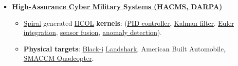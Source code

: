 \documentclass{article}
\newenvironment{achievements}{\begin{list}{$\bullet$}{\topsep 0pt \itemsep -2pt}}{\vspace*{4pt}\end{list}}
\begin{document}


        
\begin{itemize}

\item \textbf{\href{http://www.darpa.mil/Our_Work/I2O/Programs/High-Assurance_Cyber_Military_Systems_(HACMS).aspx}{High-Assurance Cyber Military Systems (HACMS, \href{http://www.darpa.mil/default.aspx}{DARPA})}}


  \begin{itemize}
    \item \href{http://spiral.net/}{Spiral}-generated \href{https://wiki.hh.se/wg211/images/e/e0/M13Franchetti.pdf}{HCOL} \textbf{kernels}: (\href{http://en.wikipedia.org/wiki/PID_controller}{PID controller}, \href{https://en.wikipedia.org/wiki/Kalman_filter}{Kalman filter}, \href{http://en.wikipedia.org/wiki/Euler_method}{Euler integration}, \href{https://en.wikipedia.org/wiki/Sensor_fusion}{sensor fusion}, \href{https://en.wikipedia.org/wiki/Anomaly_detection}{anomaly detection}).



    \item \textbf{Physical targets}: \href{http://blackirobotics.com/DARPA-SN-12-26_HACMS.php}{Black-i} \href{http://www.blackirobotics.com/LandShark_UGV_UC0M.html}{Landshark}, American Built Automobile, \href{http://smaccmpilot.org/}{SMACCM Quadcopter}. 


\end{itemize}
\end{itemize}
\end{document}
